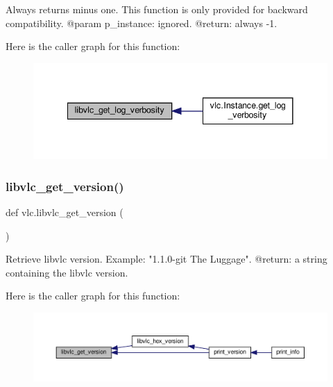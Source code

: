 \begin{DoxyVerb}Always returns minus one.
This function is only provided for backward compatibility.
@param p_instance: ignored.
@return: always -1.
\end{DoxyVerb}
 Here is the caller graph for this function\+:
\nopagebreak
\begin{figure}[H]
\begin{center}
\leavevmode
\includegraphics[width=341pt]{namespacevlc_a137f63c88981266f69851dd13a25658e_icgraph}
\end{center}
\end{figure}
\mbox{\label{namespacevlc_abf0d92070a21456079ca64ef86649828}} 
\subsubsection{\texorpdfstring{libvlc\+\_\+get\+\_\+version()}{libvlc\_get\_version()}}
{\footnotesize\ttfamily def vlc.\+libvlc\+\_\+get\+\_\+version (\begin{DoxyParamCaption}{ }\end{DoxyParamCaption})}

\begin{DoxyVerb}Retrieve libvlc version.
Example: "1.1.0-git The Luggage".
@return: a string containing the libvlc version.
\end{DoxyVerb}
 Here is the caller graph for this function\+:
\nopagebreak
\begin{figure}[H]
\begin{center}
\leavevmode
\includegraphics[width=350pt]{namespacevlc_abf0d92070a21456079ca64ef86649828_icgraph}
\end{center}
\end{figure}
\mbox{\label{namespacevlc_a53e26e809dfb7c1f1a1f25d5e0530472}} 
